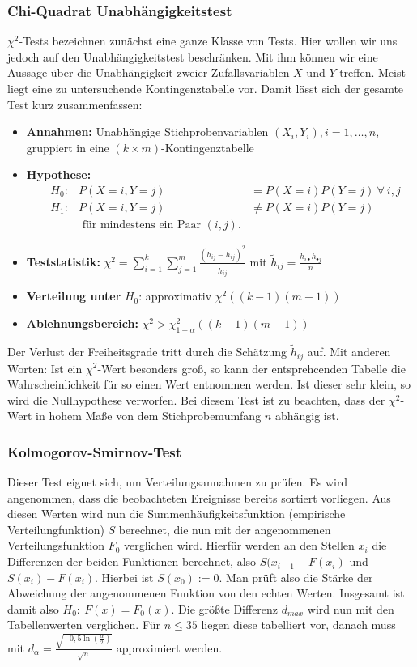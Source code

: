\subsubsection{Chi-Quadrat Unabhängigkeitstest}
\(\chi^{2}\)-Tests bezeichnen zunächst eine ganze Klasse von Tests. Hier wollen wir uns jedoch auf den Unabhängigkeitstest beschränken.
Mit ihm können wir eine Aussage über die Unabhängigkeit zweier Zufallsvariablen
 \(X\) und \(Y\) treffen. Meist liegt eine zu untersuchende Kontingenztabelle
vor. Damit lässt sich der gesamte Test kurz zusammenfassen:
\begin{itemize}
	\item \textbf{Annahmen:} Unabhängige  Stichprobenvariablen \((X_i,Y_i), i = 1,\dots , n\), gruppiert in eine \((k\times m)\)-Kontingenztabelle
	\item \textbf{Hypothese:} \begin{align*}
					&H_0: &P(X=i,Y=j) &= P(X=i) P(Y=j)\ \forall\ i,j\\
					&H_1: &P(X=i,Y=j) &\neq P(X=i) P(Y=j)\\
					& &\text{ für mindestens ein Paar } (i,j).&
				\end{align*}
	\item \textbf{Teststatistik:} \(\chi^2 =\sum\limits_{i=1}^{k}\sum\limits_{j=1}^{m}
					\frac{(h_{ij}-\tilde{h}_{ij})^2}{\tilde{h}_{ij}}\) mit \(\tilde{h}_{ij} = \frac{ h_{i\bullet} h_{\bullet j}}{ n } \)
	\item \textbf{Verteilung unter } \(H_0\): approximativ \(\chi^2((k-1)(m-1))\)
	\item \textbf{Ablehnungsbereich:} \(\chi^2 > \chi_{1-\alpha}^2((k-1)(m-1))\)
\end{itemize}
Der Verlust der Freiheitsgrade tritt durch die Schätzung \(\tilde{h}_{ij}\) auf.
Mit anderen Worten: Ist ein \(\chi^2\)-Wert besonders groß, so kann der entsprehcenden
Tabelle die Wahrscheinlichkeit für so einen Wert entnommen werden. Ist dieser sehr
klein, so wird die Nullhypothese verworfen. Bei diesem Test ist zu beachten,
dass der \(\chi^2\)-Wert in hohem Maße von dem Stichprobemumfang \(n\) abhängig ist.

\subsubsection{Kolmogorov-Smirnov-Test}
Dieser Test eignet sich, um Verteilungsannahmen zu prüfen. Es wird angenommen, 
dass die beobachteten Ereignisse bereits sortiert vorliegen. Aus diesen Werten
wird nun die Summenhäufigkeitsfunktion (empirische Verteilungfunktion) \(S\) berechnet,
die nun mit der angenommenen Verteilungsfunktion \(F_0\) verglichen wird. Hierfür werden
an den Stellen \(x_i\) die Differenzen der beiden Funktionen berechnet, also
\(S(x_{i-1}-F(x_i)\) und \(S(x_i)-F(x_i)\). Hierbei ist \(S(x_0):=0\). Man prüft also
die Stärke der Abweichung der angenommenen Funktion von den echten Werten.
Insgesamt ist damit also \(H_0:\ F(x)=F_0(x).\)
Die größte Differenz \(d_{max}\) wird nun mit den Tabellenwerten verglichen. 
Für \(n \leq 35\) liegen diese tabelliert vor, danach muss mit 
\(d_\alpha =\frac{\sqrt{-0,5\ln(\frac{\alpha}{2})}}{\sqrt{n}}\) approximiert werden.

